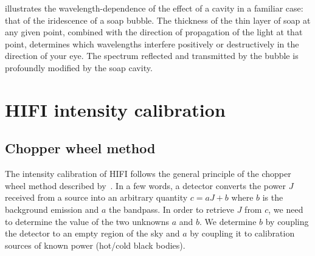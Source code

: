  illustrates the wavelength-dependence of the effect of a cavity in a familiar case: that of the iridescence of a soap bubble.
The thickness of the thin layer of soap at any given point, combined with the direction of propagation of the light at that point, determines which wavelengths interfere positively or destructively in the direction of your eye.
The spectrum reflected and transmitted by the bubble is profoundly modified by the soap cavity.





\section{HIFI intensity calibration}
\label{sec:intensity_calibration}

\subsection{Chopper wheel method}
The intensity calibration of HIFI follows the general principle of the chopper wheel method described by~\textcite{ulich1976absolute,kutner1981recommendations}.
In a few words, a detector converts the power $J$ received from a source into an arbitrary quantity $c=aJ+b$ where $b$ is the background emission and $a$ the bandpass.
In order to retrieve $J$ from $c$, we need to determine the value of the two unknowns $a$ and $b$.
We determine $b$ by coupling the detector to an empty region of the sky and $a$ by coupling it to calibration sources of known power (hot/cold black bodies).

